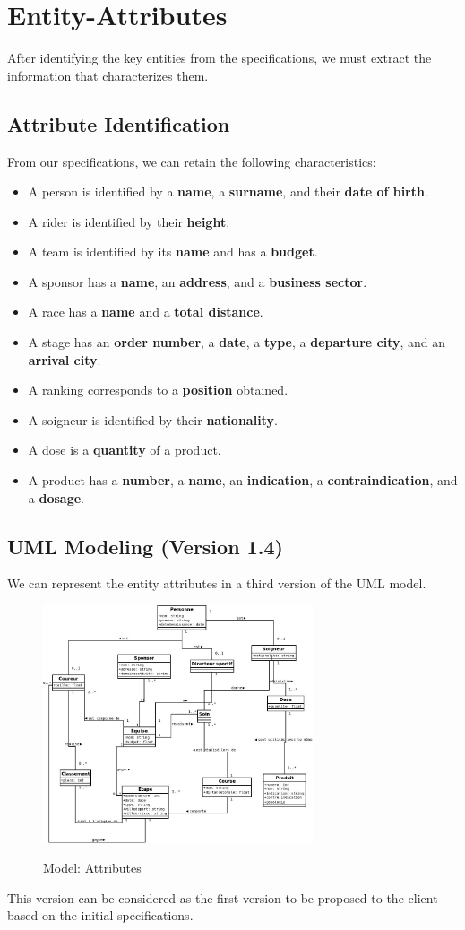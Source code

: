 \section{Entity-Attributes}

After identifying the key entities from the specifications, we must extract the information that characterizes them.

\subsection{Attribute Identification}

From our specifications, we can retain the following characteristics:

\begin{itemize}
\item A person is identified by a \textbf{name}, a \textbf{surname}, and their \textbf{date of birth}.
\item A rider is identified by their \textbf{height}.
\item A team is identified by its \textbf{name} and has a \textbf{budget}.
\item A sponsor has a \textbf{name}, an \textbf{address}, and a \textbf{business sector}.
\item A race has a \textbf{name} and a \textbf{total distance}.
\item A stage has an \textbf{order number}, a \textbf{date}, a \textbf{type}, a \textbf{departure city}, and an \textbf{arrival city}.
\item A ranking corresponds to a \textbf{position} obtained.
\item A soigneur is identified by their \textbf{nationality}.
\item A dose is a \textbf{quantity} of a product.
\item A product has a \textbf{number}, a \textbf{name}, an \textbf{indication}, a \textbf{contraindication}, and a \textbf{dosage}.
\end{itemize}

\subsection{UML Modeling (Version 1.4)}

We can represent the entity attributes in a third version of the UML model.

\begin{figure}[H]
\begin{center}
\includegraphics[height=7cm]{img/Figure4.jpg}\\
\caption{Model: Attributes}
\label{fig12}
\end{center}
\end{figure}

This version can be considered as the first version to be proposed to the client based on the initial specifications.
